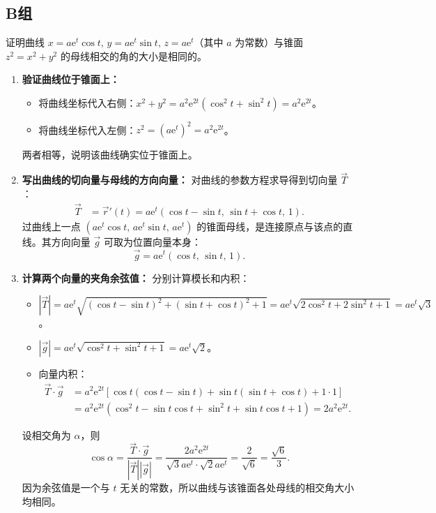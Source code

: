 \documentclass[lang=cn,11pt]{elegantbook}
\begin{document}
\subsection{B组}

\begin{exercise}[曲线与曲面交角的证明]
证明曲线 $x=a\mathrm{e}^t\cos t,\,y=a\mathrm{e}^t\sin t,\,z=a\mathrm{e}^t$（其中 $a$ 为常数）与锥面 $z^2=x^2+y^2$ 的母线相交的角的大小是相同的。
\end{exercise}
\begin{solution}
\begin{enumerate}
    \item \textbf{验证曲线位于锥面上：}
    \begin{itemize}
        \item 将曲线坐标代入右侧：$x^2+y^2 = a^2\mathrm{e}^{2t}(\cos^2 t + \sin^2 t) = a^2\mathrm{e}^{2t}$。
        \item 将曲线坐标代入左侧：$z^2 = (a\mathrm{e}^t)^2 = a^2\mathrm{e}^{2t}$。
    \end{itemize}
    两者相等，说明该曲线确实位于锥面上。

    \item \textbf{写出曲线的切向量与母线的方向向量：}
    对曲线的参数方程求导得到切向量 $\vec{T}$：
    \begin{align*}
    \vec{T} &= \vec{r}'(t) = a\mathrm{e}^t(\cos t-\sin t,\, \sin t+\cos t,\, 1).
    \end{align*}
    过曲线上一点 $(a\mathrm{e}^t\cos t,\, a\mathrm{e}^t\sin t,\, a\mathrm{e}^t)$ 的锥面母线，是连接原点与该点的直线。其方向向量 $\vec{g}$ 可取为位置向量本身：
    \[ \vec{g} = a\mathrm{e}^t(\cos t,\, \sin t,\, 1). \]

    \item \textbf{计算两个向量的夹角余弦值：}
    分别计算模长和内积：
    \begin{itemize}
        \item $|\vec{T}| = a\mathrm{e}^t\sqrt{(\cos t-\sin t)^2 + (\sin t+\cos t)^2 + 1} = a\mathrm{e}^t\sqrt{2\cos^2t + 2\sin^2t + 1} = a\mathrm{e}^t\sqrt{3}$。
        \item $|\vec{g}| = a\mathrm{e}^t\sqrt{\cos^2 t + \sin^2 t + 1} = a\mathrm{e}^t\sqrt{2}$。
        \item 向量内积：
        \begin{align*}
        \vec{T} \cdot \vec{g} &= a^2\mathrm{e}^{2t} \left[ \cos t(\cos t-\sin t) + \sin t(\sin t+\cos t) + 1\cdot 1 \right] \\
        &= a^2\mathrm{e}^{2t} (\cos^2t - \sin t\cos t + \sin^2t + \sin t\cos t + 1) = 2a^2\mathrm{e}^{2t}.
        \end{align*}
    \end{itemize}
    设相交角为 $\alpha$，则
    \[ \cos\alpha = \frac{\vec{T} \cdot \vec{g}}{|\vec{T}| |\vec{g}|} = \frac{2a^2\mathrm{e}^{2t}}{\sqrt{3}a\mathrm{e}^t \cdot \sqrt{2}a\mathrm{e}^t} = \frac{2}{\sqrt{6}} = \frac{\sqrt{6}}{3}. \]
    因为余弦值是一个与 $t$ 无关的常数，所以曲线与该锥面各处母线的相交角大小均相同。
\end{enumerate}
\end{solution}
\end{document}
